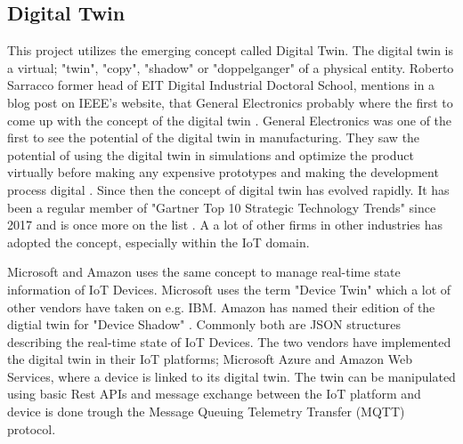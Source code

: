 \subsection{Digital Twin}
This project utilizes the emerging concept called Digital Twin. The digital twin is a virtual; "twin", "copy", "shadow" or "doppelganger" of a physical entity. Roberto Sarracco former head of EIT Digital Industrial Doctoral School, mentions in a blog post on IEEE's website, that General Electronics probably where the first to come up with the concept of the digital twin \cite{IEEE}.
General Electronics was one of the first to see the potential of the digital twin in manufacturing. They saw the potential of using the digital twin in simulations and optimize the product virtually before making any expensive prototypes and making the development process digital \cite{GE}. Since then the concept of digital twin has evolved rapidly. It has been a regular member of "Gartner Top 10 Strategic Technology Trends" since 2017 and is once more on the list \cite{Gartner}. A a lot of other firms in other industries has adopted the concept, especially within the IoT domain. 

Microsoft and Amazon uses the same concept to manage real-time state information of IoT Devices. Microsoft uses the term "Device Twin" \cite{MS} which a lot of other vendors have taken on e.g. IBM. Amazon has named their edition of the digtial twin for "Device Shadow" \cite{Amazon}. Commonly both are JSON structures describing the real-time state of IoT Devices. The two vendors have implemented the digital twin in their IoT platforms; Microsoft Azure and Amazon Web Services, where a device is linked to its digital twin. The twin can be manipulated using basic Rest APIs and message exchange between the IoT platform and device is done trough the Message Queuing Telemetry Transfer (MQTT) protocol. 